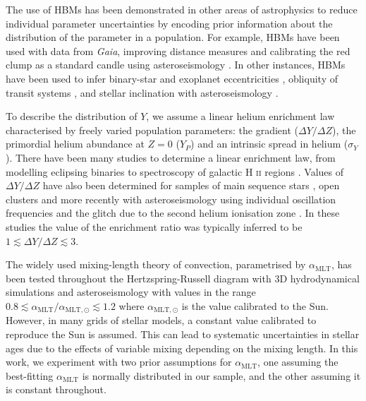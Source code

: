 \documentclass[a4paper,fleqn,usenatbib]{mnras}
\newcommand{\mlt}{\ensuremath{{\alpha_\mathrm{MLT}}}}
\begin{document}
The use of HBMs has been demonstrated in other areas of astrophysics to reduce individual parameter uncertainties by encoding prior information about the distribution of the parameter in a population. For example, HBMs have been used with data from \emph{Gaia}, improving distance measures \citep{Leistedt.Hogg2017, Anderson.Hogg.ea2018} and calibrating the red clump as a standard candle \citep{Hawkins.Leistedt.ea2017, Chan.Bovy2020} using asteroseismology \citep{Hall.Davies.ea2019}. In other instances, HBMs have been used to infer binary-star and exoplanet eccentricities \citep{Hogg.Myers.ea2010}, obliquity of transit systems \citep{Morton.Winn2014}, and stellar inclination with asteroseismology \citep{Campante.Lund.ea2016, Kuszlewicz.Chaplin.ea2019}.

To describe the distribution of $Y$, we assume a linear helium enrichment law characterised by freely varied population parameters: the gradient ($\Delta Y / \Delta Z$), the primordial helium abundance at $Z=0$ ($Y_P$) and an intrinsic spread in helium ($\sigma_Y$). There have been many studies to determine a linear enrichment law, from modelling eclipsing binaries \citep{Ribas.Jordi.ea2000} to spectroscopy of galactic H \textsc{ii} regions \citep{Balser2006}. 
Values of $\Delta Y / \Delta Z$ have also been determined for samples of main sequence stars \citep{Casagrande.Flynn.ea2007}, open clusters \citep{Brogaard.VandenBerg.ea2012} and more recently with asteroseismology using individual oscillation frequencies \citep{SilvaAguirre.Lund.ea2017} and the glitch due to the second helium ionisation zone \citep{Verma.Raodeo.ea2019}. In these studies the value of the enrichment ratio was typically inferred to be $1 \lesssim \Delta Y / \Delta Z \lesssim 3$.

The widely used mixing-length theory of convection, parametrised by $\mlt$, has been tested throughout the Hertzspring-Russell diagram with 3D hydrodynamical simulations \citep{Trampedach.Stein.ea2014, Magic.Weiss.ea2015} and asteroseismology \citep{Tayar.Somers.ea2017, Viani.Basu.ea2018, Li.Bedding.ea2018} with values in the range $0.8 \lesssim \mlt/\alpha_{\mathrm{MLT}, \odot} \lesssim 1.2$ where $\alpha_{\mathrm{MLT}, \odot}$ is the value calibrated to the Sun. However, in many grids of stellar models, a constant value calibrated to reproduce the Sun is assumed. This can lead to systematic uncertainties in stellar ages due to the effects of variable mixing depending on the mixing length. In this work, we experiment with two prior assumptions for $\mlt$, one assuming the best-fitting $\mlt$ is normally distributed in our sample, and the other assuming it is constant throughout.
\end{document}
